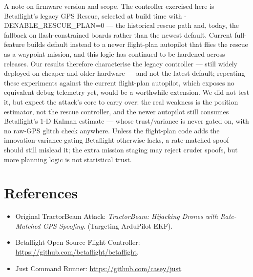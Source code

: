 \documentclass[11pt]{article}
\begin{document}
A note on firmware version and scope. The controller exercised here is Betaflight's legacy GPS Rescue, selected at build time with -DENABLE\_\allowbreak{}RESCUE\_\allowbreak{}PLAN=0 — the historical rescue path and, today, the fallback on flash-constrained boards rather than the newest default. Current full-feature builds default instead to a newer flight-plan autopilot that flies the rescue as a waypoint mission, and this logic has continued to be hardened across releases. Our results therefore characterise the legacy controller — still widely deployed on cheaper and older hardware — and not the latest default; repeating these experiments against the current flight-plan autopilot, which exposes no equivalent debug telemetry yet, would be a worthwhile extension. We did not test it, but expect the attack's core to carry over: the real weakness is the position estimator, not the rescue controller, and the newer autopilot still consumes Betaflight's 1-D Kalman estimate — whose trust/variance is never gated on, with no raw-GPS glitch check anywhere. Unless the flight-plan code adds the innovation-variance gating Betaflight otherwise lacks, a rate-matched spoof should still mislead it; the extra mission staging may reject cruder spoofs, but more planning logic is not statistical trust.

\section*{References}
\begin{itemize}
    \item[ {[1]} ] Original TractorBeam Attack: \textit{TractorBeam: Hijacking Drones with Rate-Matched GPS Spoofing}. (Targeting ArduPilot EKF).
    \item[ {[2]} ] Betaflight Open Source Flight Controller: \url{https://github.com/betaflight/betaflight}.
    \item[ {[3]} ] Just Command Runner: \url{https://github.com/casey/just}.
\end{itemize}

\newpage
\appendix
\end{document}
